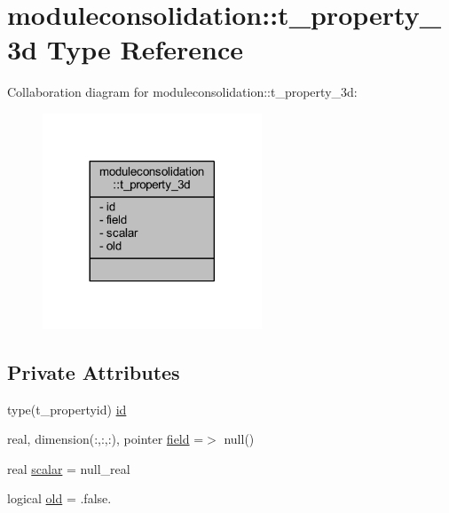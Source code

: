 \hypertarget{structmoduleconsolidation_1_1t__property__3d}{}\section{moduleconsolidation\+:\+:t\+\_\+property\+\_\+3d Type Reference}
\label{structmoduleconsolidation_1_1t__property__3d}


Collaboration diagram for moduleconsolidation\+:\+:t\+\_\+property\+\_\+3d\+:\nopagebreak
\begin{figure}[H]
\begin{center}
\leavevmode
\includegraphics[width=185pt]{structmoduleconsolidation_1_1t__property__3d__coll__graph}
\end{center}
\end{figure}
\subsection*{Private Attributes}
\begin{DoxyCompactItemize}
\item 
type(t\+\_\+propertyid) \mbox{\hyperlink{structmoduleconsolidation_1_1t__property__3d_a3eccb4b45d1334ecabc090fffe279c8f}{id}}
\item 
real, dimension(\+:,\+:,\+:), pointer \mbox{\hyperlink{structmoduleconsolidation_1_1t__property__3d_a2d91c3c0388d29a286284bbc0730d1cd}{field}} =$>$ null()
\item 
real \mbox{\hyperlink{structmoduleconsolidation_1_1t__property__3d_a68e183c621bef7f7be2fddf4a6c436d2}{scalar}} = null\+\_\+real
\item 
logical \mbox{\hyperlink{structmoduleconsolidation_1_1t__property__3d_ae2276c2d5ffb4aa23e10eb9a8bd7984b}{old}} = .false.
\end{DoxyCompactItemize}


